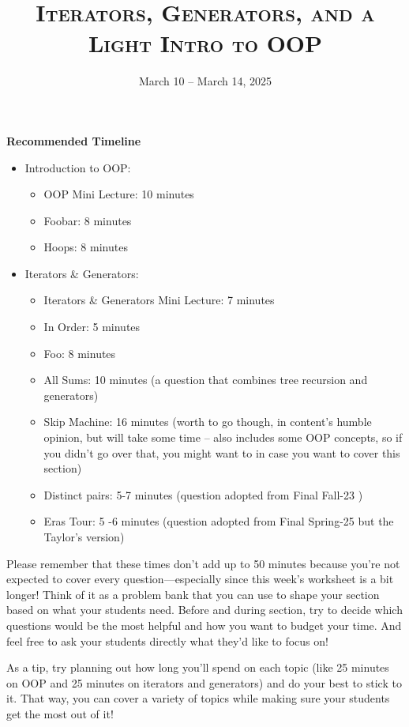\documentclass{exam}
\title{\textsc{Iterators, Generators, and a Light Intro to OOP}}
\date{March 10 -- March 14, 2025}
\begin{document}
\maketitle
\begin{guide}
    \textbf{Recommended Timeline}
    \begin{itemize}
        \item Introduction to OOP:
        \begin{itemize}
            \item OOP Mini Lecture: 10 minutes
            \item Foobar: 8 minutes
            \item Hoops: 8 minutes
        \end{itemize}
        \item Iterators \& Generators:
        \begin{itemize}
            \item Iterators \& Generators Mini Lecture: 7 minutes
            \item In Order: 5 minutes
            \item Foo: 8 minutes
            \item All Sums: 10 minutes (a question that combines tree recursion and generators)
            \item Skip Machine: 16 minutes (worth to go though, in content's humble opinion, but will take some time -- also includes some OOP concepts, so if you didn't go over that, you might want to in case you want to cover this section)
           \item Distinct pairs: 5-7 minutes (question adopted from Final Fall-23 )
           \item Eras Tour: 5 -6 minutes (question adopted from  Final Spring-25 but the Taylor's version)
        \end{itemize}
    \end{itemize}

Please remember that these times don’t add up to 50 minutes because you’re not expected to cover every question—especially since this week’s worksheet is a bit longer! Think of it as a problem bank that you can use to shape your section based on what your students need. Before and during section, try to decide which questions would be the most helpful and how you want to budget your time. And feel free to ask your students directly what they’d like to focus on!

As a tip, try planning out how long you’ll spend on each topic (like 25 minutes on OOP and 25 minutes on iterators and generators) and do your best to stick to it. That way, you can cover a variety of topics while making sure your students get the most out of it!
\end{guide}
\end{document}
